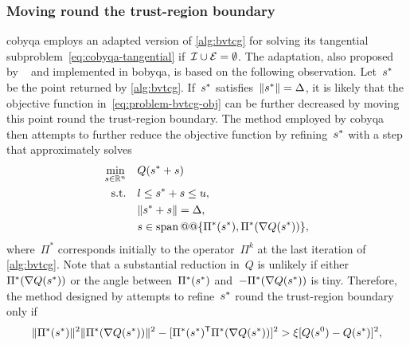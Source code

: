 
\subsubsection{Moving round the trust-region boundary}

\Gls{cobyqa} employs an adapted version of \cref{alg:bvtcg} for solving its tangential subproblem~\cref{eq:cobyqa-tangential} if~$\mathcal{I} \cup \mathcal{E} = \emptyset$.
The adaptation, also proposed by \citeauthor{Powell_2009}~\cite[\S~3]{Powell_2009} and implemented in \gls{bobyqa}, is based on the following observation.
Let~$\sstep[\ast]$ be the point returned by \cref{alg:bvtcg}.
If~$\sstep[\ast]$ satisfies~$\norm{\sstep[\ast]} = \rad$, it is likely that the objective function in~\cref{eq:problem-bvtcg-obj} can be further decreased by moving this point round the trust-region boundary.
The method employed by \gls{cobyqa} then attempts to further reduce the objective function by refining~$\sstep[\ast]$ with a step that approximately solves
\begin{subequations}
    \label{eq:cobyqa-tangential-bounds-alternative}
    \begin{align}
        \min_{\sstep \in \R^n}  & \quad Q(\sstep[\ast] + \sstep)\\
        \text{s.t.}             & \quad \xl \le \sstep[\ast] + \sstep \le \xu,\\
                                & \quad \norm{\sstep[\ast] + \sstep} = \rad,\\
                                & \quad \sstep \in \vspan @@ \set{\Pi^{\ast}(\sstep[\ast]), \Pi^{\ast}(\nabla Q(\sstep[\ast]))},
    \end{align}
\end{subequations}
where~$\Pi^{\ast}$ corresponds initially to the operator~$\Pi^k$ at the last iteration of \cref{alg:bvtcg}.
Note that a substantial reduction in~$Q$ is unlikely if either~$\Pi^{\ast}(\nabla Q(\sstep[\ast]))$ or the angle between~$\Pi^{\ast}(\sstep[\ast])$ and~$-\Pi^{\ast}(\nabla Q(\sstep[\ast]))$ is tiny.
Therefore, the method designed by \citeauthor{Powell_2009} attempts to refine~$\sstep[\ast]$ round the trust-region boundary only if
\begin{equation*}
    \norm{\Pi^{\ast}(\sstep[\ast])}^2 \norm{\Pi^{\ast}(\nabla Q(\sstep[\ast]))}^2 - [\Pi^{\ast}(\sstep[\ast])^{\T} \Pi^{\ast}(\nabla Q(\sstep[\ast]))]^2 > \xi [Q(\sstep[0]) - Q(\sstep[\ast])]^2,
\end{equation*}
